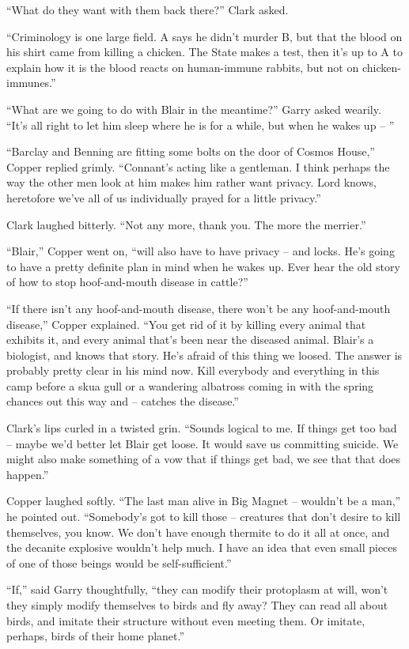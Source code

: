 \documentclass[letterpaper,openany,12pt]{memoir}		%
\begin{document}
``What do they want with them back there?'' Clark asked.

``Criminology is one large field. A says he didn't murder B, but that the blood
on his shirt came from killing a chicken. The State makes a test, then it's up
to A to explain how it is the blood reacts on human-immune rabbits, but not on
chicken-immunes.''

``What are we going to do with Blair in the meantime?'' Garry asked wearily.
``It's all right to let him sleep where he is for a while, but when he wakes up
-- ''

``Barclay and Benning are fitting some bolts on the door of Cosmos House,''
Copper replied grimly. ``Connant's acting like a gentleman. I think perhaps the
way the other men look at him makes him rather want privacy. Lord knows,
heretofore we've all of us individually prayed for a little privacy.''

Clark laughed bitterly. ``Not any more, thank you. The more the merrier.''

``Blair,'' Copper went on, ``will also have to have privacy -- and locks. He's
going to have a pretty definite plan in mind when he wakes up. Ever hear the old
story of how to stop hoof-and-mouth disease in cattle?''

``If there isn't any hoof-and-mouth disease, there won't be any hoof-and-mouth
disease,'' Copper explained. ``You get rid of it by killing every animal that
exhibits it, and every animal that's been near the diseased animal. Blair's a
biologist, and knows that story. He's afraid of this thing we loosed. The answer
is probably pretty clear in his mind now. Kill everybody and everything in this
camp before a skua gull or a wandering albatross coming in with the spring
chances out this way and -- catches the disease.''

Clark's lips curled in a twisted grin. ``Sounds logical to me. If things get too
bad -- maybe we'd better let Blair get loose. It would save us committing
suicide. We might also make something of a vow that if things get bad, we see
that that does happen.''

Copper laughed softly. ``The last man alive in Big Magnet -- wouldn't be a
man,'' he pointed out. ``Somebody's got to kill those -- creatures that don't
desire to kill themselves, you know. We don't have enough thermite to do it all
at once, and the decanite explosive wouldn't help much. I have an idea that even
small pieces of one of those beings would be self-sufficient.''

``If,'' said Garry thoughtfully, ``they can modify their protoplasm at will,
won't they simply modify themselves to birds and fly away? They can read all
about birds, and imitate their structure without even meeting them. Or imitate,
perhaps, birds of their home planet.''
\end{document}
